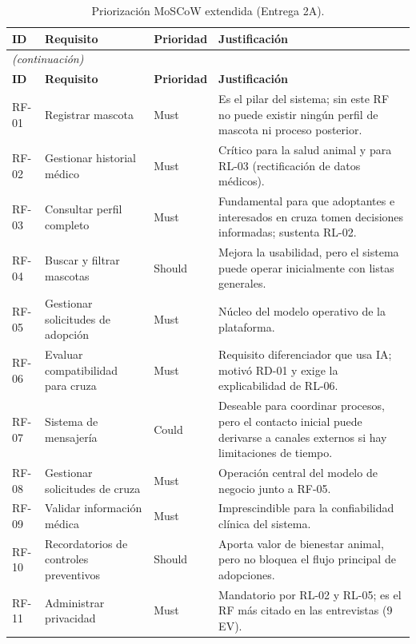 \documentclass[journal,onecolumn]{IEEEtran}
\begin{document}
	\begin{longtable}{@{}p{1.6cm} p{4.8cm} p{1.6cm} p{5.2cm}@{}}
		\caption{Priorización MoSCoW extendida (Entrega 2A).}
		\label{tab:priorizacion_moscow_parcial} \\
		\hline
		\textbf{ID} & \textbf{Requisito} & \textbf{Prioridad} & \textbf{Justificación} \\
		\hline
		\endfirsthead
		\multicolumn{4}{|l|}{\textit{(continuación)}} \\
		\hline
		\textbf{ID} & \textbf{Requisito} & \textbf{Prioridad} & \textbf{Justificación} \\
		\hline
		\endhead
		\hline
		\endfoot
		RF-01 & Registrar mascota & Must & Es el pilar del sistema; sin este RF no puede existir ningún perfil de mascota ni proceso posterior. \\
		\hline
		RF-02 & Gestionar historial médico & Must & Crítico para la salud animal y para RL-03 (rectificación de datos médicos). \\
		\hline
		RF-03 & Consultar perfil completo & Must & Fundamental para que adoptantes e interesados en cruza tomen decisiones informadas; sustenta RL-02. \\
		\hline
		RF-04 & Buscar y filtrar mascotas & Should & Mejora la usabilidad, pero el sistema puede operar inicialmente con listas generales. \\
		\hline
		RF-05 & Gestionar solicitudes de adopción & Must & Núcleo del modelo operativo de la plataforma. \\
		\hline
		RF-06 & Evaluar compatibilidad para cruza & Must & Requisito diferenciador que usa IA; motivó RD-01 y exige la explicabilidad de RL-06. \\
		\hline
		RF-07 & Sistema de mensajería & Could & Deseable para coordinar procesos, pero el contacto inicial puede derivarse a canales externos si hay limitaciones de tiempo. \\
		\hline
		RF-08 & Gestionar solicitudes de cruza & Must & Operación central del modelo de negocio junto a RF-05. \\
		\hline
		RF-09 & Validar información médica & Must & Imprescindible para la confiabilidad clínica del sistema. \\
		\hline
		RF-10 & Recordatorios de controles preventivos & Should & Aporta valor de bienestar animal, pero no bloquea el flujo principal de adopciones. \\
		\hline
		RF-11 & Administrar privacidad & Must & Mandatorio por RL-02 y RL-05; es el RF más citado en las entrevistas (9 EV). \\

\end{longtable}
\end{document}
